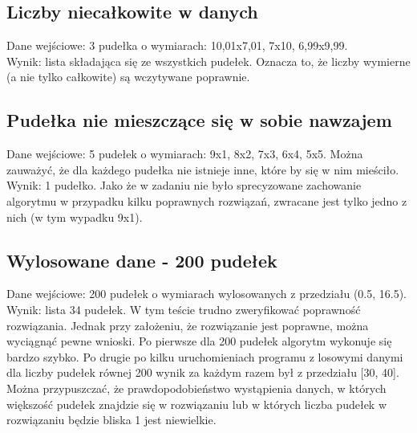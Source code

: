 \documentclass{article}
\begin{document}
\subsection{Liczby niecałkowite w danych}
Dane wejściowe: 3 pudełka o wymiarach: 10,01x7,01, 7x10, 6,99x9,99.\\
Wynik: lista składająca się ze wszystkich pudełek. Oznacza to, że liczby wymierne (a nie tylko całkowite) są wczytywane poprawnie.

\subsection{Pudełka nie mieszczące się w sobie nawzajem}
Dane wejściowe: 5 pudełek o wymiarach: 9x1, 8x2, 7x3, 6x4, 5x5. Można zauważyć, że dla każdego pudełka nie istnieje inne, które by się w nim mieściło.\\
Wynik: 1 pudełko. Jako że w zadaniu nie było sprecyzowane zachowanie algorytmu w przypadku kilku poprawnych rozwiązań, zwracane jest tylko jedno z nich (w tym wypadku 9x1).

\subsection{Wylosowane dane - 200 pudełek}
Dane wejściowe: 200 pudełek o wymiarach wylosowanych z przedziału (0.5, 16.5). \\
Wynik: lista 34 pudełek. W tym teście trudno zweryfikować poprawność rozwiązania. Jednak przy założeniu, że rozwiązanie jest poprawne, można wyciągnąć pewne wnioski. Po pierwsze dla 200 pudełek algorytm wykonuje się bardzo szybko. Po drugie po kilku uruchomieniach programu z losowymi danymi dla liczby pudełek równej 200 wynik za każdym razem był z przedziału [30, 40]. Można przypuszczać, że prawdopodobieństwo wystąpienia danych, w których większość pudełek znajdzie się w rozwiązaniu lub w których liczba pudełek w rozwiązaniu będzie bliska 1 jest niewielkie.
\end{document}
